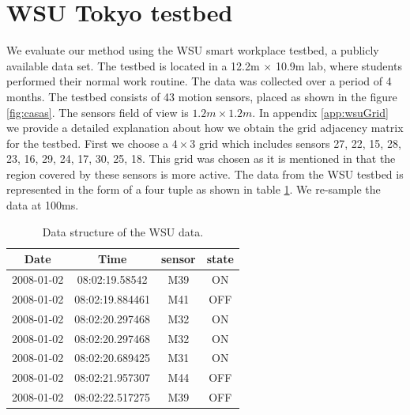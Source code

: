 \section{WSU Tokyo testbed}
We evaluate our method using the WSU smart workplace testbed\cite{cook2010detection}, a publicly available data set. The testbed is located in a 12.2m $\times$ 10.9m  lab,  where students performed their normal work routine. The data was collected over a period of 4 months. 
The testbed consists of 43 motion sensors, placed as shown in the figure \ref{fig:casas}. The sensors field of view is $1.2m \times 1.2m$. In appendix \ref{app:wsuGrid} we provide a detailed explanation about how we obtain the grid adjacency matrix for the testbed.
First we choose a $4 \times 3$ grid which includes sensors 27, 22, 15, 28, 23, 16, 29, 24, 17, 30, 25, 18. This grid was chosen as it is mentioned in \cite{cook2010detection} that the region covered by these sensors is more active.
The data from the WSU testbed is represented in the form of a four tuple as shown in table \ref{tab:WSUDATA}. We re-sample the data at 100ms.

\begin{table}[]
\centering
\caption{Data structure of the WSU data.}
\label{tab:WSUDATA}
\begin{tabular}{|c|c|c|c|}
\hline
Date       & Time            & sensor & state \\ \hline
2008-01-02 & 08:02:19.58542  & M39    & ON    \\ \hline
2008-01-02 & 08:02:19.884461 & M41    & OFF   \\ \hline
2008-01-02 & 08:02:20.297468 & M32    & ON    \\ \hline
2008-01-02 & 08:02:20.297468 & M32    & ON    \\ \hline
2008-01-02 & 08:02:20.689425 & M31    & ON    \\ \hline
2008-01-02 & 08:02:21.957307 & M44    & OFF   \\ \hline
2008-01-02 & 08:02:22.517275 & M39    & OFF   \\ \hline
\end{tabular}
\end{table}


